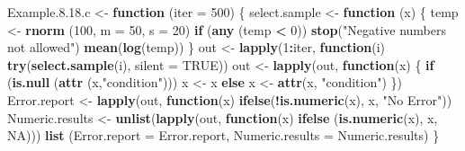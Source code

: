\documentclass[
]{book}
\newenvironment{Shaded}{\begin{snugshade}}{\end{snugshade}}
\newcommand{\AttributeTok}[1]{\textcolor[rgb]{0.13,0.29,0.53}{#1}}
\newcommand{\ConstantTok}[1]{\textcolor[rgb]{0.56,0.35,0.01}{#1}}
\newcommand{\ControlFlowTok}[1]{\textcolor[rgb]{0.13,0.29,0.53}{\textbf{#1}}}
\newcommand{\DecValTok}[1]{\textcolor[rgb]{0.00,0.00,0.81}{#1}}
\newcommand{\FloatTok}[1]{\textcolor[rgb]{0.00,0.00,0.81}{#1}}
\newcommand{\FunctionTok}[1]{\textcolor[rgb]{0.13,0.29,0.53}{\textbf{#1}}}
\newcommand{\NormalTok}[1]{#1}
\newcommand{\OtherTok}[1]{\textcolor[rgb]{0.56,0.35,0.01}{#1}}
\newcommand{\SpecialCharTok}[1]{\textcolor[rgb]{0.81,0.36,0.00}{\textbf{#1}}}
\newcommand{\StringTok}[1]{\textcolor[rgb]{0.31,0.60,0.02}{#1}}
\begin{document}
\begin{Shaded}
\begin{Highlighting}[]
\NormalTok{Example.}\DecValTok{8}\NormalTok{.}\FloatTok{18.}\NormalTok{c }\OtherTok{\textless{}{-}} \ControlFlowTok{function}\NormalTok{ (}\AttributeTok{iter =} \DecValTok{500}\NormalTok{)}
\NormalTok{\{ select.sample }\OtherTok{\textless{}{-}} \ControlFlowTok{function}\NormalTok{ (x) }
\NormalTok{  \{ temp }\OtherTok{\textless{}{-}} \FunctionTok{rnorm}\NormalTok{ (}\DecValTok{100}\NormalTok{, }\AttributeTok{m =} \DecValTok{50}\NormalTok{, }\AttributeTok{s =} \DecValTok{20}\NormalTok{)}
    \ControlFlowTok{if}\NormalTok{ (}\FunctionTok{any}\NormalTok{ (temp }\SpecialCharTok{\textless{}} \DecValTok{0}\NormalTok{)) }\FunctionTok{stop}\NormalTok{(}\StringTok{"Negative numbers not allowed"}\NormalTok{)}
    \FunctionTok{mean}\NormalTok{(}\FunctionTok{log}\NormalTok{(temp))                                                         \}}
\NormalTok{  out }\OtherTok{\textless{}{-}} \FunctionTok{lapply}\NormalTok{(}\DecValTok{1}\SpecialCharTok{:}\NormalTok{iter, }\ControlFlowTok{function}\NormalTok{(i) }
                        \FunctionTok{try}\NormalTok{(}\FunctionTok{select.sample}\NormalTok{(i), }\AttributeTok{silent =} \ConstantTok{TRUE}\NormalTok{))}
\NormalTok{  out }\OtherTok{\textless{}{-}} \FunctionTok{lapply}\NormalTok{(out, }\ControlFlowTok{function}\NormalTok{(x)}
\NormalTok{                     \{ }\ControlFlowTok{if}\NormalTok{ (}\FunctionTok{is.null}\NormalTok{ (}\FunctionTok{attr}\NormalTok{ (x,}\StringTok{"condition"}\NormalTok{))) x }\OtherTok{\textless{}{-}}\NormalTok{ x}
                       \ControlFlowTok{else}\NormalTok{ x }\OtherTok{\textless{}{-}} \FunctionTok{attr}\NormalTok{(x, }\StringTok{"condition"}\NormalTok{)}
\NormalTok{                     \})}
\NormalTok{  Error.report }\OtherTok{\textless{}{-}} \FunctionTok{lapply}\NormalTok{(out, }\ControlFlowTok{function}\NormalTok{(x) }
                              \FunctionTok{ifelse}\NormalTok{(}\SpecialCharTok{!}\FunctionTok{is.numeric}\NormalTok{(x), x, }\StringTok{"No Error"}\NormalTok{))}
\NormalTok{  Numeric.results }\OtherTok{\textless{}{-}} \FunctionTok{unlist}\NormalTok{(}\FunctionTok{lapply}\NormalTok{(out, }\ControlFlowTok{function}\NormalTok{(x)   }
                                        \FunctionTok{ifelse}\NormalTok{ (}\FunctionTok{is.numeric}\NormalTok{(x), x, }\ConstantTok{NA}\NormalTok{)))}
  \FunctionTok{list}\NormalTok{ (}\AttributeTok{Error.report =}\NormalTok{ Error.report, }\AttributeTok{Numeric.results =}\NormalTok{ Numeric.results) }
\NormalTok{\}}
\end{Highlighting}
\end{Shaded}
\end{document}

